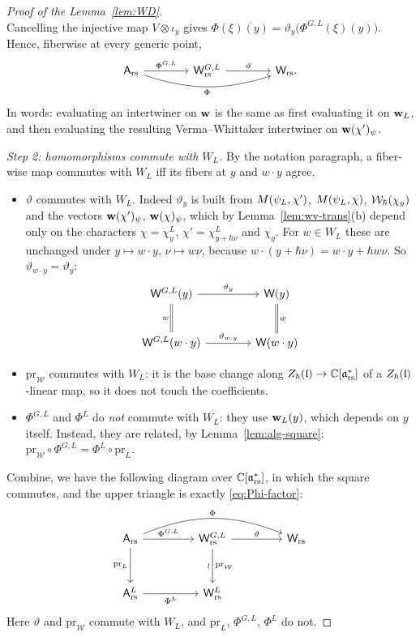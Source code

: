 \documentclass{article}
\theoremstyle{plain}
\theoremstyle{definition}
\theoremstyle{remark}
\numberwithin{equation}{section}
\begin{document}
\begin{proof}[Proof of the Lemma~\ref{lem:WD}]
\[\]
Cancelling the injective map $V\otimes\iota_y$ gives $\Phi(\xi)(y)=\vartheta_y\bigl(\Phi^{G,L}(\xi)(y)\bigr)$. Hence, fiberwise at every generic point,
\begin{equation}\label{eq:Phi-factor}
\begin{tikzcd}[column sep=4em]
\sfA_\rs\arrow[r,"\Phi^{G,L}"]\arrow[rr,bend right=18,"\Phi"'] & \sfW^{G,L}_\rs\arrow[r,"\vartheta"] & \sfW_\rs .
\end{tikzcd}
\end{equation}
In words: evaluating an intertwiner on $\mathbf w$ is the same as first evaluating it on $\mathbf w_L$, and then evaluating the resulting Verma--Whittaker intertwiner on $\mathbf w(\chi')_\psi$.

\emph{Step 2: homomorphisms commute with $W_L$.} By the notation paragraph, a fiber-wise map commutes with $W_L$ iff its fibers at $y$ and $w\cdot y$ agree.
\begin{itemize}
\item $\vartheta$ commutes with $W_L$. Indeed $\vartheta_y$ is built from $M(\psi_L,\chi')$, $M(\psi_L, \chi)$, $\mathcal{W}_\hbar(\chi_y)$ and the vectors $\mathbf w(\chi')_\psi$, $\mathbf w(\chi)_\psi$, which by Lemma~\ref{lem:wv-trans}(b) depend only on the characters $\chi=\chi^L_y$, $\chi'=\chi^L_{y+\hbar\nu}$ and $\chi_y$. For $w\in W_L$ these are unchanged under $y\mapsto w\cdot y$, $\nu\mapsto w\nu$, because $w\cdot(y+\hbar\nu)=w\cdot y+\hbar w\nu$. So $\vartheta_{w\cdot y}=\vartheta_y$:
\[
\begin{tikzcd}[column sep=4em,row sep=2.5em]
\sfW^{G,L}(y)\arrow[r,"\vartheta_y"]\arrow[d,equal,"w"'] & \sfW(y)\arrow[d,equal,"w"]\\
\sfW^{G,L}(w\cdot y)\arrow[r,"\vartheta_{w\cdot y}"] & \sfW(w\cdot y)
\end{tikzcd}
\]
\item $\mathrm{pr}_{\mathcal W}$ commutes with $W_L$: it is the base change along $Z_\hbar(\mathfrak{l})\to\mathbb{C}[\mathfrak{a}^*_{\mathrm{rs}}]$ of a $Z_\hbar(\mathfrak{l})$-linear map, so it does not touch the coefficients.
\item $\Phi^{G,L}$ and $\Phi^L$ do \emph{not} commute with $W_L$: they use $\mathbf w_L(y)$, which depends on $y$ itself. Instead, they are related, by Lemma~\ref{lem:alg-square}: $\mathrm{pr}_{\mathcal W}\circ\Phi^{G,L}=\Phi^L\circ\mathrm{pr}_L$.
\end{itemize}
Combine, we have the following diagram over $\mathbb{C}[\mathfrak{a}^*_{\mathrm{rs}}]$, in which the square commutes, and the upper triangle is exactly \eqref{eq:Phi-factor}:
\begin{equation}\label{eq:WD-diagram}
\begin{tikzcd}[column sep=4.5em,row sep=3em]
\sfA_\rs\arrow[r,"\Phi^{G,L}"]\arrow[d,"\mathrm{pr}_L"']\arrow[rr,bend left=22,"\Phi"] & \sfW^{G,L}_\rs\arrow[r,"\vartheta"]\arrow[d,"\mathrm{pr}_{\mathcal W}","\wr"'] & \sfW_\rs\\
\sfA^L_\rs\arrow[r,"\Phi^L"'] & \sfW^L_\rs &
\end{tikzcd}
\end{equation}
Here $\vartheta$ and $\mathrm{pr}_{\mathcal W}$ commute with $W_L$, and $\mathrm{pr}_L$, $\Phi^{G,L}$, $\Phi^L$ do not.


\end{proof}
\end{document}
